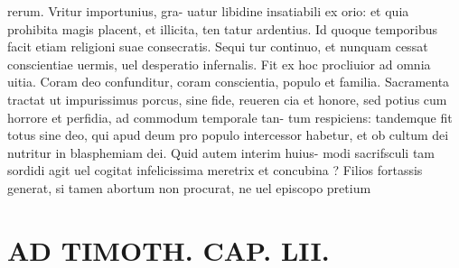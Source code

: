 \documentclass{article}
\begin{document}
\begin{pages}
rerum. Vritur importunius, gra- uatur libidine insatiabili ex orio: et quia prohibita magis placent, et illicita, ten tatur ardentius. Id quoque temporibus facit etiam religioni suae consecratis. Sequi tur continuo, et nunquam cessat conscientiae uermis, uel desperatio infernalis. Fit ex hoc procliuior ad omnia uitia. Coram deo confunditur, coram conscientia, populo et familia. Sacramenta tractat ut impurissimus porcus, sine fide, reueren cia et honore, sed potius cum horrore et perfidia, ad commodum temporale tan- tum respiciens: tandemque fit totus sine deo, qui apud deum pro populo intercessor habetur, et ob cultum dei nutritur in blasphemiam dei. Quid autem interim huius- modi sacrifsculi tam sordidi agit uel cogitat infelicissima meretrix et concubina ? Filios fortassis generat, si tamen abortum non procurat, ne uel episcopo pretium  \pend
\section*{AD TIMOTH. CAP. LII. }

\end{pages}
\end{document}
